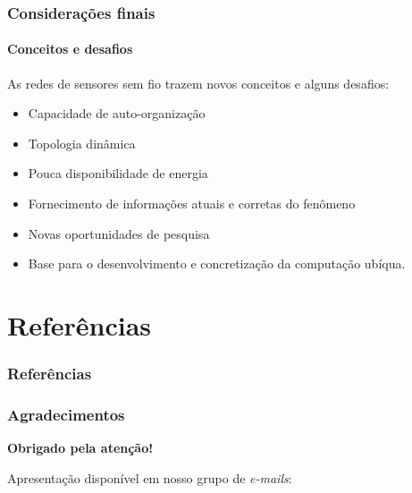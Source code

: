 \documentclass[notes]{beamer}
\begin{document}
\begin{frame}
\label{slide_72}
\frametitle{Considerações finais}
\framesubtitle{Conceitos e desafios}

\begin{block}

As redes de sensores sem fio trazem novos conceitos e alguns desafios: \pause

\begin{itemize}


\item Capacidade de auto-organização \pause
\item Topologia dinâmica \pause
\item Pouca disponibilidade de energia \pause
\item Fornecimento de informações atuais e corretas do fenômeno \pause

\end{itemize}

\end{block}

\begin{exampleblock} 

\begin{itemize}

\item Novas oportunidades de pesquisa \pause
\item Base para o desenvolvimento e concretização da computação ubíqua.

\end{itemize}

\end{exampleblock}

\end{frame}

\section{Referências}
\begin{frame}
\label{slide_73}
\frametitle{Referências}




\end{frame}

\begin{frame}
\label{slide_74}
\frametitle{Agradecimentos}
\vskip20pt

\begin{center}
{\bf \color{alert} Obrigado pela atenção!}
\end{center}

\vskip20pt

\begin{center}
Apresentação disponível em nosso grupo de \textit{e-mails}:\\
\vskip12pt
\end{center}

\titlepage
\end{frame}
\end{document}
